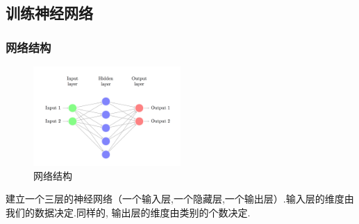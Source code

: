 \documentclass[table]{beamer}
\begin{document}
\subsection{训练神经网络}
\begin{frame}
	\frametitle{网络结构}
	\begin{figure}
		\includegraphics[width=0.5\textwidth]{nn-from-scratch-3-layer-network.png}
		\caption{网络结构}
		\label{fig:nn}
	\end{figure}
	建立一个三层的神经网络（一个输入层,一个隐藏层,一个输出层）.输入层的维度由我们的数据决定.同样的, 输出层的维度由类别的个数决定.
\end{frame}
\end{document}
